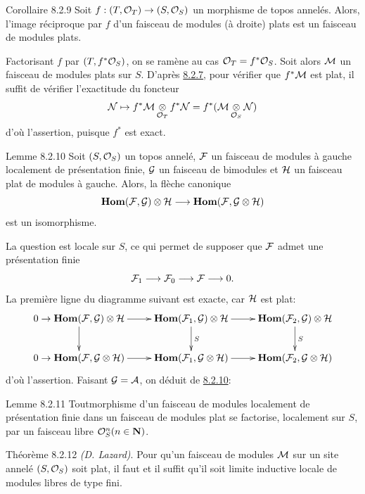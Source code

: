 \documentclass[10pt]{../fichiers-configuration-latex/smfart}
\begin{document}
\begin{enonce*}{Corollaire 8.2.9}
Soit $f : (T, \Oo_T) \to (S, \Oo_S)$ un morphisme de
topos annelés. Alors, l'image réciproque par $f$ d'un faisceau de
modules (à droite) plats est un faisceau de modules plats.
\end{enonce*}

Factorisant $f$ par $(T, f^{\ast} {\mathcal O}_S)$, on se ramène au cas
${\mathcal O}_T = f^{\ast} {\mathcal O}_S$. Soit alors ${\mathcal M}$ un
faisceau de modules plats sur $S$. D'après \hyperref[V.prop8.2.7]{8.2.7}, pour vérifier que
$f^{\ast} {\mathcal M}$ est plat, il suffit de vérifier l'exactitude du
foncteur
$$
{\mathcal N} \mapsto f^{\ast} {\mathcal M} \mathop{\otimes}_{{\mathcal O}_T}
f^{\ast} {\mathcal N} = f^{\ast} ({\mathcal M} \mathop{\otimes}_{{\mathcal O}_S} {\mathcal N})
$$
d'où l'assertion, puisque $f^{\ast}$ est exact.

\begin{enonce*}{Lemme 8.2.10}
Soit $(S, {\mathcal O}_S)$ un topos annelé, ${\mathcal F}$ un faisceau de modules à
gauche localement de présentation finie, ${\mathcal G}$ un faisceau de
bimodules et ${\mathcal H}$ un faisceau plat de modules à gauche. Alors, la
flèche canonique
$$
\Hhom (\Ff, \Gg) \otimes \Hh \to \Hhom
(\Ff, \Gg \otimes \Hh)
$$
est un isomorphisme.
\end{enonce*}

La question est locale sur $S$, ce qui permet de supposer que
${\mathcal F}$ admet une présentation finie
$$
\Ff_1 \to \Ff_0 \to \Ff \to 0{\quoi}.
$$
La première ligne  du diagramme suivant est exacte, car ${\mathcal H}$
est plat:
\[
\xymatrix{
0 \to \Hhom(\Ff,\Gg) \otimes \Hh \ar[r] \ar[d]&
\Hhom(\Ff_1, \Gg) \otimes \Hh \ar[r]\ar[d]^{S} &
\Hhom(\Ff_2,\Gg) \otimes \Hh \ar[d]^{S}\\
0 \to \Hhom(\Ff,\Gg \otimes \Hh) \ar[r]&
\Hhom(\Ff_1, \Gg \otimes \Hh) \ar[r] &
\Hhom(\Ff_2,\Gg \otimes \Hh)
}
\]
d'où l'assertion. Faisant ${\mathcal G} = {\mathcal A}$, on déduit de \hyperref[V.lem8.2.10]{8.2.10}:

\begin{enonce*}{Lemme 8.2.11}
Tout\pageoriginale morphisme d'un faisceau de modules localement de
présentation finie dans un faisceau de modules plat se factorise,
localement sur $S$, par un faisceau libre ${\mathcal O}_S^n (n \in \mathbf{N})$.
\end{enonce*}

\begin{enonce*}{Théorème 8.2.12}
\emph{(D. Lazard)}. Pour qu'un faisceau de modules ${\mathcal M}$ sur un site
  annelé $(S, {\mathcal O}_S)$ soit plat, il faut et il suffit qu'il
  soit limite inductive locale de modules libres de type fini.
\end{enonce*}
\end{document}
